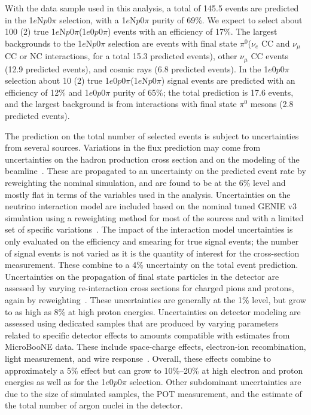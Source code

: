 \documentclass[reprint,
 amsmath,amssymb,
 aps,prd,
 superscriptaddress,
 twocolumn, longbibliography
]{revtex4-1}
\newcommand{\nue}{$\nu_e$\xspace}
\newcommand{\numu}{$\nu_{\mu}$\xspace}
\newcommand{\npsel}{1$e$N$p$0$\pi$\xspace}
\newcommand{\zpsel}{1$e$0$p$0$\pi$\xspace}
\newcommand{\npi}{\ensuremath{\pi^0}\xspace}
\begin{document}
With the data sample used in this analysis, a total of 145.5 events are predicted in the \npsel selection, with a \npsel purity of 69\%.  We expect to select about 100 (2) true \npsel (\zpsel) events with an efficiency of 17\%.
 The largest backgrounds to the \npsel selection are events with final state \npi (\nue CC and \numu CC or NC interactions, for a total 15.3 predicted events), other \numu CC events (12.9 predicted events), and cosmic rays (6.8 predicted events). In the \zpsel selection about 10 (2) true \zpsel (\npsel) signal events are predicted with an efficiency of 12\% and \zpsel purity of 65\%; the total prediction is 17.6 events, and the largest background is from  interactions with final state $\pi^{0}$ mesons (2.8 predicted events). 

The prediction on the total number of selected events is subject to uncertainties from several sources. Variations in the flux prediction may come from uncertainties on the hadron production cross section and on the modeling of the beamline~\cite{mbflux,mbflux2}.  These are propagated to an uncertainty on the predicted event rate by reweighting the nominal simulation, and are found to be at the 6\% level and mostly flat in terms of the variables used in the analysis. 
Uncertainties on the neutrino interaction model are included based on the nominal tuned GENIE v3 simulation using a reweighting method for most of the sources and with a limited set of specific variations~\cite{ubtune}. 
The impact of the interaction model uncertainties is only evaluated on the efficiency and smearing for true signal events; the number of signal events is not varied as it is the quantity of interest for the cross-section measurement. These combine to a 4\% uncertainty on the total event prediction.
Uncertainties on the propagation of final state particles in the detector are assessed by varying re-interaction cross sections for charged pions and protons, again by reweighting~\cite{G4Reweight}.  These uncertainties are generally at the 1\% level, but grow to as high as 8\% at high proton energies. Uncertainties on detector modeling are assessed using dedicated samples that are produced by varying parameters related to specific detector effects to amounts compatible with estimates from MicroBooNE data.  These include space-charge effects, electron-ion recombination, light measurement, and wire response~\cite{DetSyst}. Overall, these effects combine to approximately a 5\% effect but can grow to 10\%--20\% at high electron and proton energies as well as for the \zpsel selection. Other subdominant uncertainties are due to the size of simulated samples, the POT measurement, and the estimate of the total number of argon nuclei in the detector. 
\end{document}
